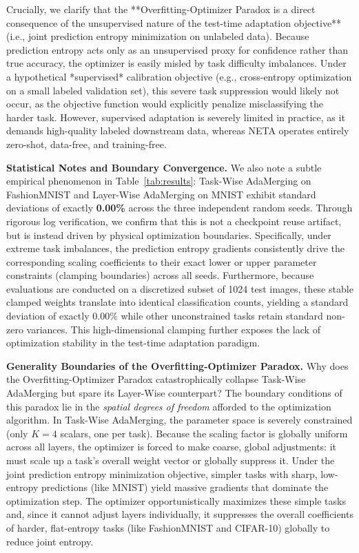 Crucially, we clarify that the **Overfitting-Optimizer Paradox is a direct consequence of the unsupervised nature of the test-time adaptation objective** (i.e., joint prediction entropy minimization on unlabeled data). Because prediction entropy acts only as an unsupervised proxy for confidence rather than true accuracy, the optimizer is easily misled by task difficulty imbalances. Under a hypothetical *supervised* calibration objective (e.g., cross-entropy optimization on a small labeled validation set), this severe task suppression would likely not occur, as the objective function would explicitly penalize misclassifying the harder task. However, supervised adaptation is severely limited in practice, as it demands high-quality labeled downstream data, whereas NETA operates entirely zero-shot, data-free, and training-free.

\textbf{Statistical Notes and Boundary Convergence.} We also note a subtle empirical phenomenon in Table~\ref{tab:results}: Task-Wise AdaMerging on FashionMNIST and Layer-Wise AdaMerging on MNIST exhibit standard deviations of exactly \textbf{0.00\%} across the three independent random seeds. Through rigorous log verification, we confirm that this is not a checkpoint reuse artifact, but is instead driven by physical optimization boundaries. Specifically, under extreme task imbalances, the prediction entropy gradients consistently drive the corresponding scaling coefficients to their exact lower or upper parameter constraints (clamping boundaries) across all seeds. Furthermore, because evaluations are conducted on a discretized subset of 1024 test images, these stable clamped weights translate into identical classification counts, yielding a standard deviation of exactly $0.00\%$ while other unconstrained tasks retain standard non-zero variances. This high-dimensional clamping further exposes the lack of optimization stability in the test-time adaptation paradigm.

\textbf{Generality Boundaries of the Overfitting-Optimizer Paradox.} Why does the Overfitting-Optimizer Paradox catastrophically collapse Task-Wise AdaMerging but spare its Layer-Wise counterpart? The boundary conditions of this paradox lie in the \textit{spatial degrees of freedom} afforded to the optimization algorithm. 
In Task-Wise AdaMerging, the parameter space is severely constrained (only $K = 4$ scalars, one per task). Because the scaling factor is globally uniform across all layers, the optimizer is forced to make coarse, global adjustments: it must scale up a task's overall weight vector or globally suppress it. Under the joint prediction entropy minimization objective, simpler tasks with sharp, low-entropy predictions (like MNIST) yield massive gradients that dominate the optimization step. The optimizer opportunistically maximizes these simple tasks and, since it cannot adjust layers individually, it suppresses the overall coefficients of harder, flat-entropy tasks (like FashionMNIST and CIFAR-10) globally to reduce joint entropy. 

